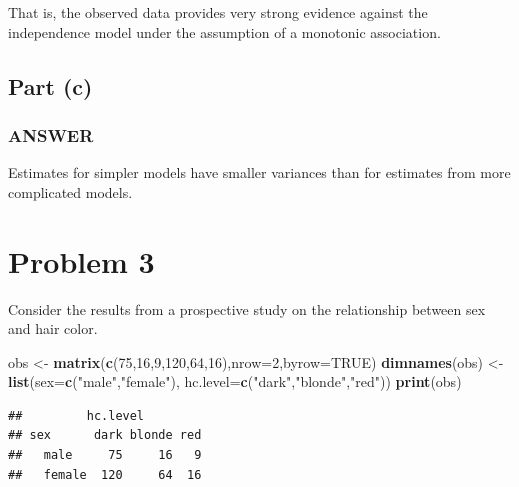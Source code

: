 \documentclass[
]{article}
\newenvironment{Shaded}{\begin{snugshade}}{\end{snugshade}}
\newcommand{\AttributeTok}[1]{\textcolor[rgb]{0.13,0.29,0.53}{#1}}
\newcommand{\ConstantTok}[1]{\textcolor[rgb]{0.56,0.35,0.01}{#1}}
\newcommand{\DecValTok}[1]{\textcolor[rgb]{0.00,0.00,0.81}{#1}}
\newcommand{\FunctionTok}[1]{\textcolor[rgb]{0.13,0.29,0.53}{\textbf{#1}}}
\newcommand{\NormalTok}[1]{#1}
\newcommand{\OtherTok}[1]{\textcolor[rgb]{0.56,0.35,0.01}{#1}}
\newcommand{\StringTok}[1]{\textcolor[rgb]{0.31,0.60,0.02}{#1}}
\begin{document}
That is, the observed data provides very strong evidence against the
independence model under the assumption of a monotonic association.

\hypertarget{part-c-1}{%
\subsection{Part (c)}\label{part-c-1}}


\hypertarget{answer-12}{%
\subsubsection{ANSWER}\label{answer-12}}

Estimates for simpler models have smaller variances than for estimates
from more complicated models.

\hypertarget{problem-3}{%
\section{Problem 3}\label{problem-3}}

Consider the results from a prospective study on the relationship
between sex and hair color.

\begin{Shaded}
\begin{Highlighting}[]
\NormalTok{obs }\OtherTok{\textless{}{-}} \FunctionTok{matrix}\NormalTok{(}\FunctionTok{c}\NormalTok{(}\DecValTok{75}\NormalTok{,}\DecValTok{16}\NormalTok{,}\DecValTok{9}\NormalTok{,}\DecValTok{120}\NormalTok{,}\DecValTok{64}\NormalTok{,}\DecValTok{16}\NormalTok{),}\AttributeTok{nrow=}\DecValTok{2}\NormalTok{,}\AttributeTok{byrow=}\ConstantTok{TRUE}\NormalTok{)}
\FunctionTok{dimnames}\NormalTok{(obs) }\OtherTok{\textless{}{-}} \FunctionTok{list}\NormalTok{(}\AttributeTok{sex=}\FunctionTok{c}\NormalTok{(}\StringTok{"male"}\NormalTok{,}\StringTok{"female"}\NormalTok{),}
                      \AttributeTok{hc.level=}\FunctionTok{c}\NormalTok{(}\StringTok{"dark"}\NormalTok{,}\StringTok{"blonde"}\NormalTok{,}\StringTok{"red"}\NormalTok{))}
\FunctionTok{print}\NormalTok{(obs)}
\end{Highlighting}
\end{Shaded}

\begin{verbatim}
##         hc.level
## sex      dark blonde red
##   male     75     16   9
##   female  120     64  16
\end{verbatim}
\end{document}
